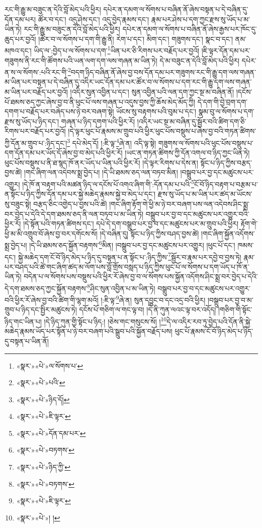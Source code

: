 རང་གི་རྒྱུ་མ་བཟུང་ན་དེའི་བློ་མེད་པའི་ཕྱིར། དཔེར་ན་དམག་ལ་སོགས་པ་བཞིན་ནོ་ཞེས་བསྟན་པ་དེ་བཞིན་དུ་དོན་དམ་པར། ཚོར་བ་དང་། འདུ་ཤེས་དང་། འདུ་བྱེད་རྣམས་དང་། རྣམ་པར་ཤེས་པ་དག་ཀྱང་རྫས་སུ་ཡོད་པ་མ་ཡིན་ཏེ། རང་གི་རྒྱུ་མ་བཟུང་ན་དེའི་བློ་མེད་པའི་ཕྱིར། དཔེར་ན་དམག་ལ་སོགས་པ་བཞིན་ནོ་ཞེས་རྒྱས་པར་ཁོང་དུ་ཆུད་པར་བྱའོ། །ཚོར་བ་ལ་སོགས་པ་དག་གི་རྒྱུ་ནི། རེག་པ་དང་། མིག་དང་། གཟུགས་དང་། སྣང་བ་དང་། ནམ་མཁའ་དང་། ཡིད་ལ་:བྱེད་པ་ལ་སོགས་པ་དག་\footnote{«སྣར་»«པེ་»ལ་སོགས་པ་}ཡིན་པར་ཅི་རིགས་པར་བརྗོད་པར་བྱའོ། །ཇི་ལྟར་དོན་དམ་པར་གཟུགས་ནི་རང་གི་ཚོགས་པའི་ཡན་ལག་དག་ལས་གཞན་མ་ཡིན་ཏེ། དེ་མ་བཟུང་ན་དེའི་བློ་མེད་པའི་ཕྱིར། དཔེར་ན་ས་ལ་སོགས་:པའི་རང་གི་\footnote{«སྣར་»«པེ་»པའི་}བདག་ཉིད་བཞིན་ནོ་ཞེས་བྱ་བས་དོན་དམ་པར་གཟུགས་རང་གི་རྒྱུ་དག་ལས་གཞན་མ་ཡིན་པར་བསྟན་པ་དེ་བཞིན་དུ་འདིར་ཡང་དོན་དམ་པར་ཚོར་བ་ལ་སོགས་པ་དག་རང་གི་རྒྱུ་དག་ལས་གཞན་མ་ཡིན་པར་བརྗོད་པར་བྱའོ། །འདིར་སུན་འབྱིན་པ་དང་། སུན་འབྱིན་པའི་ལན་དག་ཀྱང་སྔ་མ་བཞིན་ནོ། །དངོས་པོ་ཐམས་ཅད་ཀྱང་ཞེས་བྱ་བ་ནི་ཕུང་པོ་ལས་གཞན་པ་འདུས་བྱས་ཀྱི་ཆོས་མེད་མོད་ཀྱི། དེ་དག་གི་བྱེ་བྲག་དག་དགག་པ་བརྗོད་པར་བཞེད་པས་ཉེ་བར་བཞག་སྟེ། ཡོངས་སུ་བརྟགས་པའི་བུམ་པ་དང་། སྣམ་བུ་ལ་སོགས་པ་དག་རྫས་སུ་ཡོད་པ་ཉིད་དང་། གཞན་པ་ཉིད་དགག་པའི་ཕྱིར་རོ། །འདིར་ཡང་སྔ་མ་བཞིན་དུ་སྦྱོར་བའི་ཚིག་དག་ཅི་རིགས་པར་བརྗོད་པར་བྱའོ། །དེ་ལྟར་ཕུང་པོ་རྣམས་མ་གྲུབ་པའི་ཕྱིར་ཕུང་པོས་བསྡུས་པ་ཞེས་བྱ་བའི་གཏན་ཚིགས་ཀྱི་དོན་མ་གྲུབ་པ་:ཉིད་དང་།\footnote{«སྣར་»«པེ་»ཉིད་དོ།} དཔེ་མེད་དོ། །:ཇི་ལྟ་\footnote{«སྣར་»«པེ་»ཇི་ལྟར་}ཞེ་ན། འདི་ལྟ་སྟེ། གཟུགས་ལ་སོགས་པའི་ཕུང་པོས་བསྡུས་པ་དག་དོན་དམ་པར་ཡོད་དོ་ཞེས་བྱ་བ་མེད་པའི་ཕྱིར་རོ། །ཡང་ན་གཏན་ཚིགས་ཀྱི་དོན་འགལ་བ་ཉིད་ཀྱང་ཡིན་ཏེ། ཕུང་པོས་བསྡུས་པ་ནི་ཐ་སྙད་ཁོ་ནར་ཡོད་པ་ཡིན་པའི་ཕྱིར་རོ། །དེ་ལྟར་རིགས་པ་དེས་ན། སྟོང་པ་ཉིད་ཀྱིས་བརྩད་བྱས་ཚེ། །གང་ཞིག་ལན་འདེབས་སྨྲ་བྱེད་པ། །དེ་ཡི་ཐམས་ཅད་ལན་བཏབ་མིན། །བསྒྲུབ་པར་བྱ་དང་མཚུངས་པར་འགྱུར། །དེ་ཁོ་ན་བརྟག་པའི་མཚན་ཉིད་ལ་དངོས་པོ་འགའ་ཞིག་གི་:དོན་དམ་པ་པའི་\footnote{«སྣར་»«པེ་»དོན་དམ་པར་}ངོ་བོ་ཉིད་བརྟག་པ་བརྩམ་པ་ན་སྟོང་པ་ཉིད་ཀྱིས་དོན་དམ་པར་སྐྱེ་མཆེད་རྣམས་སྐྱེ་བ་མེད་པ་དང་། རྫས་སུ་ཡོད་པ་མ་ཡིན་པར་ཚད་མ་ཡོངས་སུ་བཟུང་སྟེ། བརྩད་ཅིང་འགྱེད་པ་བྱས་པའི་ཚེ། །གང་ཞིག་རྟོག་གེ་ཕྱི་མ་ཉེ་བར་བཞག་པས་ལན་འདེབས་ཤིང་སྨྲ་བར་བྱེད་པ་དེའི་དེ་དག་ཐམས་ཅད་ནི་ལན་བཏབ་པ་མ་ཡིན་ཏེ། བསྒྲུབ་པར་བྱ་བ་དང་མཚུངས་པར་འགྱུར་བའི་ཕྱིར་རོ། །དེ་སྟོན་པའི་གཏན་ཚིགས་དང་། དཔེ་དེ་དག་བསྒྲུབ་པར་བྱ་བ་དང་མཚུངས་པར་མ་གྲུབ་པའི་ཕྱིར། རྟོག་གེ་ཕྱི་མ་མི་འགྲུབ་བོ་ཞེས་བྱ་བར་དགོངས་སོ། །དེ་བཞིན་དུ། སྟོང་པ་ཉིད་ཀྱིས་བཤད་བྱས་ཚེ། །གང་ཞིག་སྐྱོན་འདོགས་སྨྲ་བྱེད་པ། །དེ་ཡི་ཐམས་ཅད་སྐྱོན་བརྟགས་\footnote{«སྣར་»«པེ་»བཏགས་}མིན། །བསྒྲུབ་པར་བྱ་དང་མཚུངས་པར་འགྱུར། །ཕུང་པོ་དང་། ཁམས་དང་། སྐྱེ་མཆེད་དག་ངོ་བོ་ཉིད་མེད་པ་ཉིད་དུ་བསྟན་པ་ན་སྟོང་པ་:ཉིད་ཀྱིས་\footnote{«སྣར་»«པེ་»ཉིད་ཀྱི་}སྦྱོར་བ་རྣམ་པར་དབྱེ་བ་བྱས་ཏེ། རྣམ་པར་བཤད་པའི་ཚེ་གང་ཞིག་ཚད་མ་ལོག་པས་བློ་གྲོས་བསླད་པ་ཉིད་ཀྱིས་ཕུང་པོ་ལ་སོགས་པ་དག་ཡོད་པ་ཁོ་ན་ཡིན་ཏེ། བདེན་པ་ལ་སོགས་པས་བསྡུས་པའི་ཕྱིར་རོ་ཞེས་བྱ་བ་ལ་སོགས་པས་སྐྱོན་འདོགས་ཤིང་སྨྲ་བར་བྱེད་པ་དེའི་དེ་དག་ཐམས་ཅད་ཀྱང་སྐྱོན་བརྟགས་\footnote{«སྣར་»«པེ་»བཏགས་}ཤིང་སུན་འབྱིན་པ་མ་ཡིན་ཏེ། བསྒྲུབ་པར་བྱ་བ་དང་མཚུངས་པར་འགྱུར་བའི་ཕྱིར་རོ་ཞེས་བྱ་བའི་ཚིག་གི་ལྷག་མའོ། །:ཇི་ལྟ་\footnote{«སྣར་»«པེ་»ཇི་ལྟར་}ཞེ་ན། སུན་དབྱུང་བ་དང་འདྲ་བའི་ཕྱིར། །བསྒྲུབ་པར་བྱ་བ་མ་གྲུབ་པ་ཉིད་དང་སྤྱིར་མཚུངས་ཏེ། དངོས་པོ་གཅིག་ལ་གང་ལྟ་བ། །དེ་ནི་ཀུན་ལའང་ལྟ་བར་འདོད། །གཅིག་གི་སྟོང་ཉིད་གང་ཡིན་པ། །དེ་ཉིད་ཀུན་གྱི་སྟོང་པ་ཉིད:། །ཅེས་གང་གསུངས་སོ། །\footnote{«སྣར་»«པེ་»། །}དེ་ལ་འདིར་རབ་ཏུ་བྱེད་པའི་དོན་ནི་སྐྱེ་མཆེད་རྣམས་ཡོད་པར་སྟོན་པ་ཉེ་བར་བཞག་པའི་སྒྲུབ་པའི་སྐྱོན་བརྗོད་པས། ཕུང་པོ་རྣམས་ངོ་བོ་ཉིད་མེད་པ་ཉིད་དུ་བསྟན་པ་ཡིན་ནོ། 